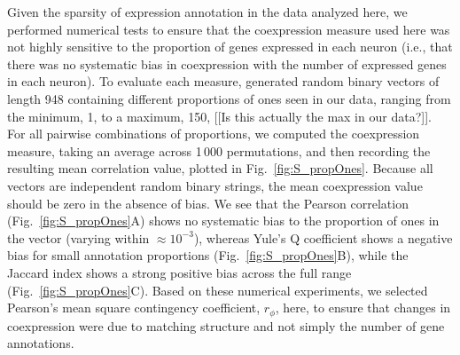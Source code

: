 \documentclass[10pt,letterpaper]{article}
\begin{document}
Given the sparsity of expression annotation in the data analyzed here, we performed numerical tests to ensure that the coexpression measure used here was not highly sensitive to the proportion of genes expressed in each neuron (i.e., that there was no systematic bias in coexpression with the number of expressed genes in each neuron).
To evaluate each measure, generated random binary vectors of length 948 containing different proportions of ones seen in our data, ranging from the minimum, 1, to a maximum, 150, [[Is this actually the max in our data?]].
For all pairwise combinations of proportions, we computed the coexpression measure, taking an average across 1\,000 permutations, and then recording the resulting mean correlation value, plotted in Fig.~\ref{fig:S_propOnes}.
Because all vectors are independent random binary strings, the mean coexpression value should be zero in the absence of bias.
We see that the Pearson correlation (Fig.~\ref{fig:S_propOnes}A) shows no systematic bias to the proportion of ones in the vector (varying within $\approx 10^{-3}$), whereas Yule's Q coefficient shows a negative bias for small annotation proportions (Fig.~\ref{fig:S_propOnes}B), while the Jaccard index shows a strong positive bias across the full range (Fig.~\ref{fig:S_propOnes}C).
Based on these numerical experiments, we selected Pearson's mean square contingency coefficient, $r_\phi$, here, to ensure that changes in coexpression were due to matching structure and not simply the number of gene annotations.

\end{document}
